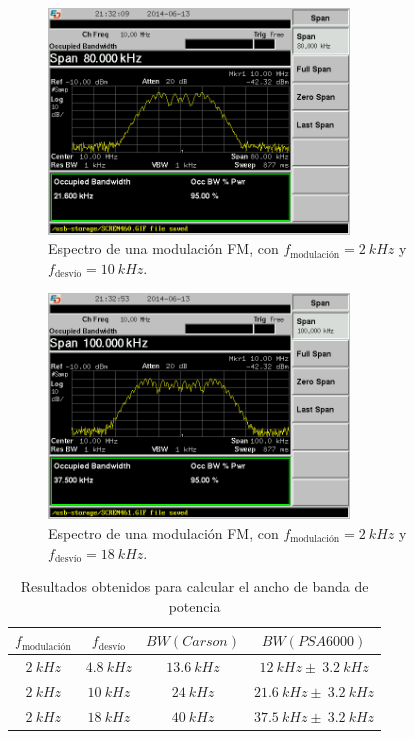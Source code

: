 \documentclass[a4paper,10pt]{article}
\begin{document}
		\begin{figure}[!htb]
			\centering
			\includegraphics[width=8cm]
			{Imagenes/SCREN461.png}
			\caption{Espectro de una modulaci\'on FM, con $
			f_{\mbox{modulaci\'on}}=2~kHz$ y $f_{\mbox{desv\'io}}=10~kHz$.}
			\label{FM10} 
		\end{figure}		
		
		\begin{figure}[!htb]
			\centering
			\includegraphics[width=8cm]
			{Imagenes/SCREN462.png}
			\caption{Espectro de una modulaci\'on FM, con $
			f_{\mbox{modulaci\'on}}=2~kHz$ y $f_{\mbox{desv\'io}}=18~kHz$.}
			\label{FM18} 
		\end{figure}
		
		\begin{table}[!htp]
			\centering
			\begin{tabular}{|c|c|c|c|}
				\hline
				$f_{\mbox{modulaci\'on}}$ & $f_{\mbox{desv\'io}}$ & $BW(Carson)$
				& $BW(PSA 6000)$ \\
				\hline
				$2~kHz$ & $4.8~kHz$& $13.6~kHz$ & $12~kHz\pm~3.2~kHz$ \\
				\hline
				$2~kHz$ & $10~kHz$& $24~kHz$ & $21.6~kHz\pm~3.2~kHz$ \\
				\hline
				$2~kHz$ & $18~kHz$& $40~kHz$ & $37.5~kHz\pm~3.2~kHz$ \\
				\hline						
			\end{tabular}
			\caption{Resultados obtenidos para calcular el ancho de banda de 
			potencia} \label{carson}
		\end{table}	
		
\end{document}
